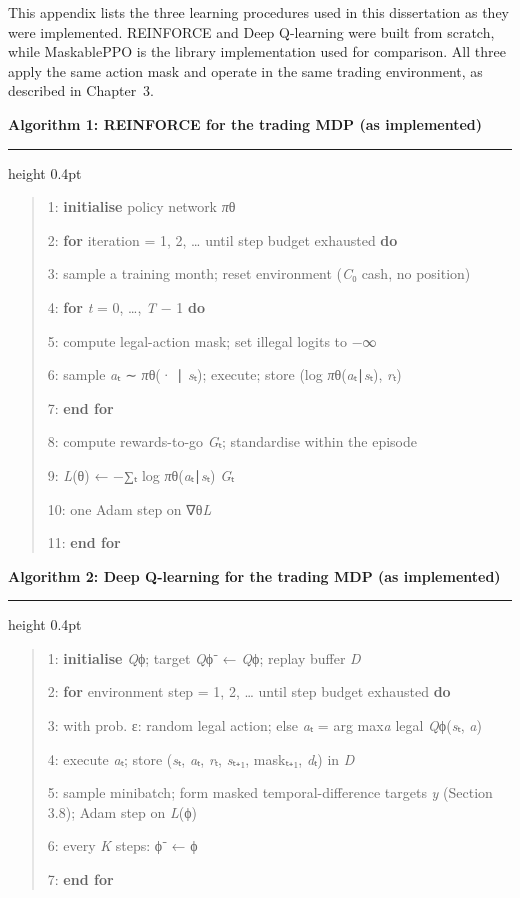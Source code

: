 
This appendix lists the three learning procedures used in this
dissertation as they were implemented. REINFORCE and Deep Q-learning
were built from scratch, while MaskablePPO is the library implementation
used for comparison. All three apply the same action mask and operate in
the same trading environment, as described in Chapter~3.

\begin{algobox}
\textbf{Algorithm 1: REINFORCE for the trading MDP (as implemented)}
\par\vspace{4pt}\hrule height 0.4pt\vspace{2pt}
\begin{quote}
1: \textbf{initialise} policy network \emph{π}θ

2: \textbf{for} iteration = 1, 2, \ldots{} until step budget exhausted
\textbf{do}

3: sample a training month; reset environment (\emph{C}₀ cash, no
position)

4: \textbf{for} \emph{t} = 0, \ldots, \emph{T} − 1 \textbf{do}

5: compute legal-action mask; set illegal logits to −∞

6: sample \emph{a}ₜ ∼ \emph{π}θ(· ∣ \emph{s}ₜ); execute; store (log
\emph{π}θ(\emph{a}ₜ∣\emph{s}ₜ), \emph{r}ₜ)

7: \textbf{end for}

8: compute rewards-to-go \emph{G}ₜ; standardise within the episode

9: \emph{L}(θ) ← −∑ₜ log \emph{π}θ(\emph{a}ₜ∣\emph{s}ₜ) \emph{G}ₜ

10: one Adam step on ∇θ\emph{L}

11: \textbf{end for}
\end{quote}
\end{algobox}

\begin{algobox}
\textbf{Algorithm 2: Deep Q-learning for the trading MDP (as
implemented)}
\par\vspace{4pt}\hrule height 0.4pt\vspace{2pt}
\begin{quote}
1: \textbf{initialise} \emph{Q}ϕ; target \emph{Q}ϕ⁻ ← \emph{Q}ϕ; replay
buffer \emph{D}

2: \textbf{for} environment step = 1, 2, \ldots{} until step budget
exhausted \textbf{do}

3: with prob. ε: random legal action; else \emph{a}ₜ = arg max\emph{a}
legal \emph{Q}ϕ(\emph{s}ₜ, \emph{a})

4: execute \emph{a}ₜ; store (\emph{s}ₜ, \emph{a}ₜ, \emph{r}ₜ,
\emph{s}ₜ₊₁, maskₜ₊₁, \emph{d}ₜ) in \emph{D}

5: sample minibatch; form masked temporal-difference targets \emph{y}
(Section 3.8); Adam step on \emph{L}(ϕ)

6: every \emph{K} steps: ϕ⁻ ← ϕ

7: \textbf{end for}
\end{quote}
\end{algobox}

